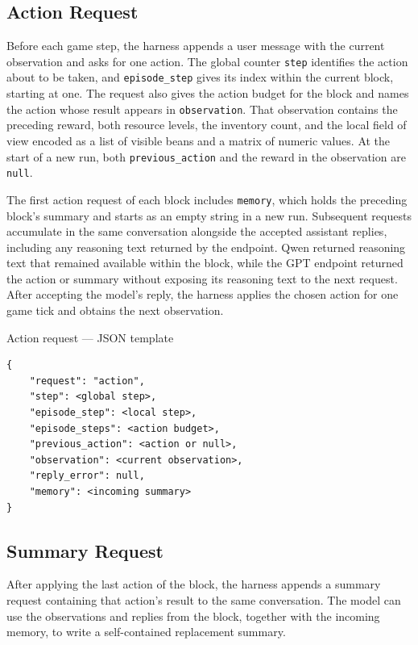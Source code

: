 \subsection{Action Request}

Before each game step, the harness appends a user message with the current observation and asks for one action.
The global counter \verb|step| identifies the action about to be taken, and \verb|episode_step| gives its index within the current block, starting at one.
The request also gives the action budget for the block and names the action whose result appears in \verb|observation|.
That observation contains the preceding reward, both resource levels, the inventory count, and the local field of view encoded as a list of visible beans and a matrix of numeric values.
At the start of a new run, both \verb|previous_action| and the reward in the observation are \verb|null|.

The first action request of each block includes \verb|memory|, which holds the preceding block's summary and starts as an empty string in a new run.
Subsequent requests accumulate in the same conversation alongside the accepted assistant replies, including any reasoning text returned by the endpoint.
Qwen returned reasoning text that remained available within the block, while the GPT endpoint returned the action or summary without exposing its reasoning text to the next request.
After accepting the model's reply, the harness applies the chosen action for one game tick and obtains the next observation.

\begin{pilotmessage}{Action request --- JSON template}
\begin{verbatim}
{
    "request": "action",
    "step": <global step>,
    "episode_step": <local step>,
    "episode_steps": <action budget>,
    "previous_action": <action or null>,
    "observation": <current observation>,
    "reply_error": null,
    "memory": <incoming summary>
}
\end{verbatim}
\end{pilotmessage}

\subsection{Summary Request}

After applying the last action of the block, the harness appends a summary request containing that action's result to the same conversation.
The model can use the observations and replies from the block, together with the incoming memory, to write a self-contained replacement summary.

